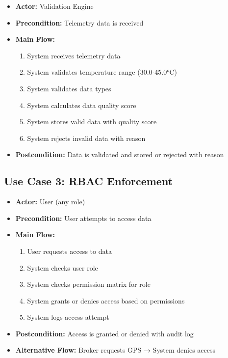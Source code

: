 \begin{itemize}
    \item \textbf{Actor:} Validation Engine
    \item \textbf{Precondition:} Telemetry data is received
    \item \textbf{Main Flow:}
    \begin{enumerate}
        \item System receives telemetry data
        \item System validates temperature range (30.0-45.0°C)
        \item System validates data types
        \item System calculates data quality score
        \item System stores valid data with quality score
        \item System rejects invalid data with reason
    \end{enumerate}
    \item \textbf{Postcondition:} Data is validated and stored or rejected with reason
\end{itemize}

\subsection{Use Case 3: RBAC Enforcement}

\begin{itemize}
    \item \textbf{Actor:} User (any role)
    \item \textbf{Precondition:} User attempts to access data
    \item \textbf{Main Flow:}
    \begin{enumerate}
        \item User requests access to data
        \item System checks user role
        \item System checks permission matrix for role
        \item System grants or denies access based on permissions
        \item System logs access attempt
    \end{enumerate}
    \item \textbf{Postcondition:} Access is granted or denied with audit log
    \item \textbf{Alternative Flow:} Broker requests GPS → System denies access
\end{itemize}

